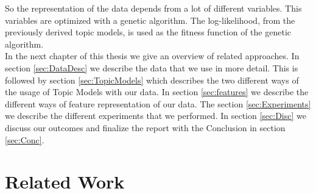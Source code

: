 \documentclass[a4paper,fleqn]{article}
\begin{document}
So the representation of the data depends from a lot of different variables. This variables are optimized with a genetic algorithm. The log-likelihood, from the previously derived topic models, is used as the fitness function of the genetic algorithm.\\

In the next chapter of this thesis we give an overview of related approaches. In section \ref{sec:DataDesc} we describe the data that we use in more detail. This is followed by section \ref{sec:TopicModels} which describes the two different ways of the usage of Topic Models with our data. In section \ref{sec:features} we describe the different ways of feature representation of our data. The section \ref{sec:Experiments} we describe the different experiments that we performed. In section \ref{sec:Disc} we discuss our outcomes and finalize the report with the Conclusion in section \ref{sec:Conc}.



% 
% 
% 
\pagebreak



\section{Related Work}

\end{document}
